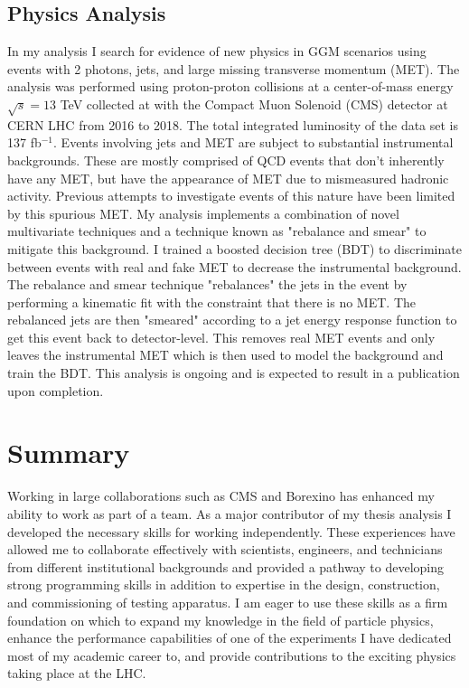 \documentclass[a4paper]{article}
\begin{document}
\subsection{Physics Analysis}
In my analysis I search for evidence of new physics in GGM scenarios using events with 2 photons, jets, and large missing transverse momentum (MET).  The analysis was performed using proton-proton collisions at a center-of-mass energy $\sqrt{s}=13$ TeV collected at with the Compact Muon Solenoid (CMS) detector at CERN LHC from 2016 to 2018.  The total integrated luminosity of the data set is 137 fb$^{-1}$. Events involving jets and MET are subject to substantial instrumental backgrounds.  These are mostly comprised of QCD events that don't inherently have any MET, but have the appearance of MET due to mismeasured hadronic activity.  Previous attempts to investigate events of this nature have been limited by this spurious MET. My analysis implements a combination of novel multivariate techniques and a technique known as "rebalance and smear" to mitigate this background.  I trained a boosted decision tree (BDT) to discriminate between events with real and fake MET to decrease the instrumental background.  The rebalance and smear technique "rebalances" the jets in the event by performing a kinematic fit with the constraint that there is no MET.  The rebalanced jets are then "smeared" according to a jet energy response function to get this event back to detector-level.  This removes real MET events and only leaves the instrumental MET which is then used to model the background and train the BDT. This analysis is ongoing and is expected to result in a publication upon completion.



\section{Summary}
Working in large collaborations such as CMS and Borexino has enhanced my ability to work as part of a team. As a major contributor of my thesis analysis I developed the necessary skills for working independently.  These experiences have allowed me to collaborate effectively with scientists, engineers, and technicians from different institutional backgrounds and provided a pathway to developing strong programming skills in addition to expertise in the design, construction, and commissioning of testing apparatus.  I am eager to use these skills as a firm foundation on which to expand my knowledge in the field of particle physics, enhance the performance capabilities of one of the experiments I have dedicated most of my academic career to, and provide contributions to the exciting physics taking place at the LHC.
	
	
	
\end{document}
